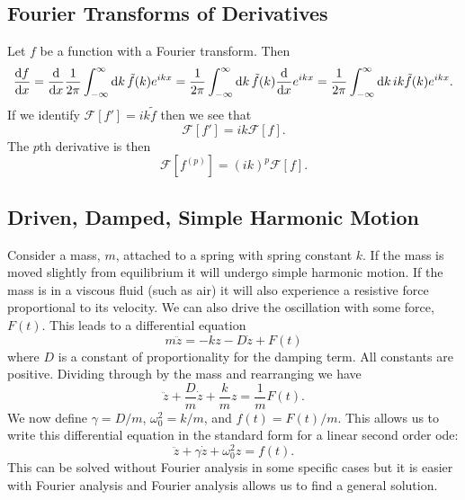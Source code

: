 \documentclass[a4paper]{article}
\newcommand{\FT}{\mathcal{F}}
\begin{document}
    \subsection{Fourier Transforms of Derivatives}
    Let \(f\) be a function with a Fourier transform.
    Then
    \[\dv{f}{x} = \dv{x}\frac{1}{2\pi} \int_{-\infty}^{\infty} \dd{k} \tilde{f}(k) e^{ikx} = \frac{1}{2\pi} \int_{-\infty}^{\infty} \dd{k} \tilde{f}(k) \dv{x} e^{ikx} = \frac{1}{2\pi} \int_{-\infty}^{\infty} \dd{k} ik \tilde{f}(k)e^{ikx}.\]
    If we identify \(\FT[f'] = ik\tilde{f}\) then we see that
    \[\FT[f'] = ik\FT[f].\]
    The \(p\)th derivative is then
    \[\FT[f^{(p)}] = (ik)^p\FT[f].\]
    
    \subsection{Driven, Damped, Simple Harmonic Motion}
    Consider a mass, \(m\), attached to a spring with spring constant \(k\).
    If the mass is moved slightly from equilibrium it will undergo simple harmonic motion.
    If the mass is in a viscous fluid (such as air) it will also experience a resistive force proportional to its velocity.
    We can also drive the oscillation with some force, \(F(t)\).
    This leads to a differential equation
    \[m\ddot{z} = -kz - D\dot{z} + F(t)\]
    where \(D\) is a constant of proportionality for the damping term.
    All constants are positive.
    Dividing through by the mass and rearranging we have
    \[\ddot{z} + \frac{D}{m}\dot{z} + \frac{k}{m}z = \frac{1}{m}F(t).\]
    We now define \(\gamma = D/m\), \(\omega_0^2 = k/m\), and \(f(t) = F(t)/m\).
    This allows us to write this differential equation in the standard form for a linear second order \gls{ode}:
    \[\ddot{z} + \gamma\dot{z} + \omega_0^2z = f(t).\]
    This can be solved without Fourier analysis in some specific cases but it is easier with Fourier analysis and Fourier analysis allows us to find a general solution.
    
\end{document}
